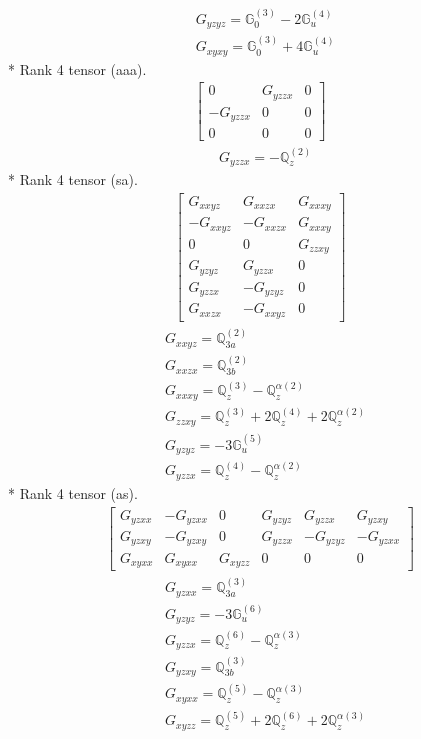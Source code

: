 \documentclass[fleqn,8pt,landscape]{jsarticle}
\begin{document}
\begin{align*}
& G_{yzyz} = \mathbb{G}_{0}^{(3)} - 2 \mathbb{G}_{u}^{(4)} \\
& G_{xyxy} = \mathbb{G}_{0}^{(3)} + 4 \mathbb{G}_{u}^{(4)}
\end{align*}
* Rank 4 tensor (aaa).
\begin{align*}
\begin{bmatrix} 0 & G_{yzzx} & 0 \\ - G_{yzzx} & 0 & 0 \\ 0 & 0 & 0 \end{bmatrix}
\end{align*}
\begin{align*}
& G_{yzzx} = - \mathbb{Q}_{z}^{(2)}
\end{align*}
* Rank 4 tensor (sa).
\begin{align*}
\begin{bmatrix} G_{xxyz} & G_{xxzx} & G_{xxxy} \\ - G_{xxyz} & - G_{xxzx} & G_{xxxy} \\ 0 & 0 & G_{zzxy} \\ G_{yzyz} & G_{yzzx} & 0 \\ G_{yzzx} & - G_{yzyz} & 0 \\ G_{xxzx} & - G_{xxyz} & 0 \end{bmatrix}
\end{align*}
\begin{align*}
& G_{xxyz} = \mathbb{Q}_{3a}^{(2)} \\
& G_{xxzx} = \mathbb{Q}_{3b}^{(2)} \\
& G_{xxxy} = \mathbb{Q}_{z}^{(3)} - \mathbb{Q}_{z}^{\alpha(2)} \\
& G_{zzxy} = \mathbb{Q}_{z}^{(3)} + 2 \mathbb{Q}_{z}^{(4)} + 2 \mathbb{Q}_{z}^{\alpha(2)} \\
& G_{yzyz} = - 3 \mathbb{G}_{u}^{(5)} \\
& G_{yzzx} = \mathbb{Q}_{z}^{(4)} - \mathbb{Q}_{z}^{\alpha(2)}
\end{align*}
* Rank 4 tensor (as).
\begin{align*}
\begin{bmatrix} G_{yzxx} & - G_{yzxx} & 0 & G_{yzyz} & G_{yzzx} & G_{yzxy} \\ G_{yzxy} & - G_{yzxy} & 0 & G_{yzzx} & - G_{yzyz} & - G_{yzxx} \\ G_{xyxx} & G_{xyxx} & G_{xyzz} & 0 & 0 & 0 \end{bmatrix}
\end{align*}
\begin{align*}
& G_{yzxx} = \mathbb{Q}_{3a}^{(3)} \\
& G_{yzyz} = - 3 \mathbb{G}_{u}^{(6)} \\
& G_{yzzx} = \mathbb{Q}_{z}^{(6)} - \mathbb{Q}_{z}^{\alpha(3)} \\
& G_{yzxy} = \mathbb{Q}_{3b}^{(3)} \\
& G_{xyxx} = \mathbb{Q}_{z}^{(5)} - \mathbb{Q}_{z}^{\alpha(3)} \\
& G_{xyzz} = \mathbb{Q}_{z}^{(5)} + 2 \mathbb{Q}_{z}^{(6)} + 2 \mathbb{Q}_{z}^{\alpha(3)}
\end{align*}
\end{document}
